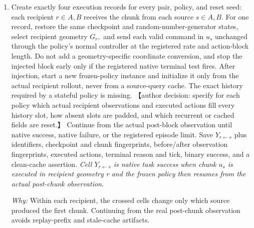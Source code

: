 \documentclass[10pt,a4paper]{article}
\begin{document}
\begin{enumerate}[leftmargin=*,start=4]
\par\emph{Why:} The visible source geometry should be the only cause of a changed chunk. Shared history, controlled decoding, repeated queries, and cache removal prevent hidden inference state or sampling variation from becoming the intervention.
  \item Create exactly four execution records for every pair, policy, and reset seed: each recipient \(r\in {A,B}\) receives the chunk from each source \(s\in {A,B}.\) For one record, restore the same checkpoint and random-number-generator states, select recipient geometry \(G_{r},\) and send each valid command in \(u_{s}\) unchanged through the policy's normal controller at the registered rate and action-block length. Do not add a geometry-specific coordinate conversion, and stop the injected block early only if the registered native terminal test fires. After injection, start a new frozen-policy instance and initialize it only from the actual recipient rollout, never from a source-query cache. The exact history required by a stateful policy is missing. 【author decision: specify for each policy which actual recipient observations and executed actions fill every history slot, how absent slots are padded, and which recurrent or cached fields are reset.】 Continue from the actual post-block observation until native success, native failure, or the registered episode limit. Save \(Y_{r\leftarrow s}\) plus identifiers, checkpoint and chunk fingerprints, before/after observation fingerprints, executed actions, terminal reason and tick, binary success, and a clean-cache assertion.
\noindent\emph{Cell \(Y_{r\leftarrow s}\) is native task success when chunk \(u_{s}\) is executed in recipient geometry r and the frozen policy then resumes from the actual post-chunk observation.}
\par{}
\par\emph{Why:} Within each recipient, the crossed cells change only which source produced the first chunk. Continuing from the real post-chunk observation avoids replay-prefix and stale-cache artifacts.

\end{enumerate}
\end{document}

